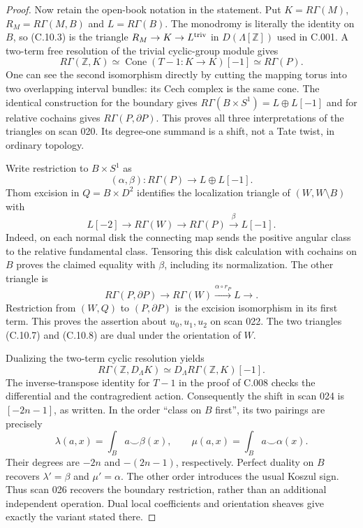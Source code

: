 \begin{proof}
Now retain the open-book notation in the statement. Put
$K=R\Gamma(M)$, $R_M=R\Gamma(M,B)$ and $L=R\Gamma(B)$.
The monodromy is literally the identity on $B$, so (C.10.3) is the
triangle $R_M\to K\to L^{\rm triv}$ in
$D(\Lambda[\mathbb Z])$ used in C.001. A two-term free resolution
of the trivial cyclic-group module gives
\[
 R\Gamma(\mathbb Z,K)\simeq
 \operatorname{Cone}(T-1:K\to K)[-1]\simeq R\Gamma(P).
 \tag{C.10.6}
\]
One can see the second isomorphism directly by cutting the mapping
torus into two overlapping interval bundles: its Cech complex is
the same cone. The identical construction for the boundary gives
$R\Gamma(B\times S^1)=L\oplus L[-1]$ and for relative cochains
gives $R\Gamma(P,\partial P)$. This proves all three interpretations
of the triangles on scan 020. Its degree-one summand is a shift,
not a Tate twist, in ordinary topology.

Write restriction to $B\times S^1$ as
\[
 (\alpha,\beta):R\Gamma(P)\longrightarrow L\oplus L[-1].
\]
Thom excision in $Q=B\times D^2$ identifies the localization
triangle of $(W,W\setminus B)$ with
\[
 L[-2]\longrightarrow R\Gamma(W)\longrightarrow
 R\Gamma(P)\xrightarrow{\beta}L[-1].
 \tag{C.10.7}
\]
Indeed, on each normal disk the connecting map sends the positive
angular class to the relative fundamental class. Tensoring this
disk calculation with cochains on $B$ proves the claimed equality
with $\beta$, including its normalization. The other triangle is
\[
 R\Gamma(P,\partial P)\longrightarrow R\Gamma(W)
 \xrightarrow{\alpha\circ r_P}L\longrightarrow.
 \tag{C.10.8}
\]
Restriction from $(W,Q)$ to $(P,\partial P)$ is the excision
isomorphism in its first term. This proves the assertion about
$u_0,u_1,u_2$ on scan 022. The two triangles (C.10.7) and (C.10.8)
are dual under the orientation of $W$.

Dualizing the two-term cyclic resolution yields
\[
 R\Gamma(\mathbb Z,D_\Lambda K)
 \simeq D_\Lambda R\Gamma(\mathbb Z,K)[-1].
\]
The inverse-transpose identity for $T-1$ in the proof of C.008
checks the differential and the contragredient action. Consequently
the shift in scan 024 is $[-2n-1]$, as written. In the order
``class on $B$ first'', its two pairings are precisely
\[
 \lambda(a,x)=\int_B a\smile\beta(x),\qquad
 \mu(a,x)=\int_B a\smile\alpha(x).
 \tag{C.10.9}
\]
Their degrees are $-2n$ and $-(2n-1)$, respectively. Perfect
duality on $B$ recovers $\lambda'=\beta$ and $\mu'=\alpha$.
The other order introduces the usual Koszul sign. Thus scan 026
recovers the boundary restriction, rather than an additional
independent operation. Dual local coefficients and orientation
sheaves give exactly the variant stated there.


\end{proof}
